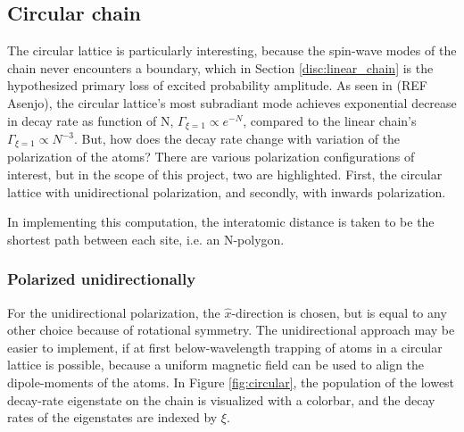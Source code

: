 \documentclass{article}
\begin{document}
\subsection{Circular chain}\label{disc:circular}

The circular lattice is particularly interesting, because the spin-wave modes of the chain never encounters a boundary, which in Section \ref{disc:linear_chain} is the hypothesized primary loss of excited probability amplitude. As seen in (REF Asenjo), the circular lattice's most subradiant mode achieves exponential decrease in decay rate as function of N, $\Gamma_{\xi = 1} \propto e^{-N}$, compared to the linear chain's $\Gamma_{\xi=1} \propto N^{-3}$. But, how does the decay rate change with variation of the polarization of the atoms? There are various polarization configurations of interest, but in the scope of this project, two are highlighted. First, the circular lattice with unidirectional polarization, and secondly, with inwards polarization. 

In implementing this computation, the interatomic distance is taken to be the shortest path between each site, i.e. an N-polygon. 

\subsubsection{Polarized unidirectionally}

For the unidirectional polarization, the $\hat{x}$-direction is chosen, but is equal to any other choice because of rotational symmetry. The unidirectional approach may be easier to implement, if at first below-wavelength trapping of atoms in a circular lattice is possible, because a uniform magnetic field can be used to align the dipole-moments of the atoms. In Figure \ref{fig:circular}, the population of the lowest decay-rate eigenstate on the chain is visualized with a colorbar, and the decay rates of the eigenstates are indexed by $\xi$. 
\end{document}
